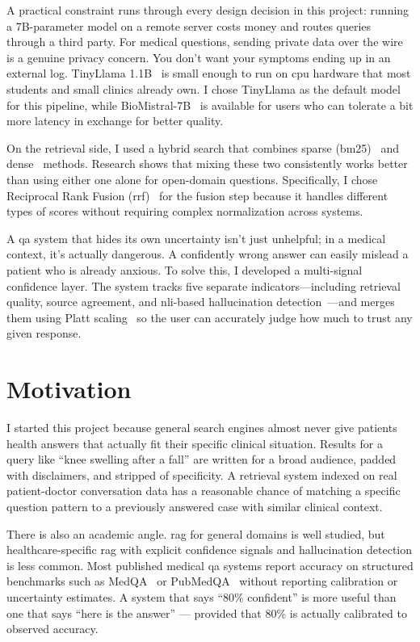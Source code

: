 A practical constraint runs through every design decision in this project: running a 7B-parameter model on a remote server costs money and routes queries through a third party. For medical questions, sending private data over the wire is a genuine privacy concern. You don't want your symptoms ending up in an external log. TinyLlama 1.1B~\cite{zhang2024tinyllama} is small enough to run on \ac{cpu} hardware that most students and small clinics already own. I chose TinyLlama as the default model for this pipeline, while BioMistral-7B~\cite{labrak2024biomistral} is available for users who can tolerate a bit more latency in exchange for better quality.

On the retrieval side, I used a hybrid search that combines sparse (\ac{bm25})~\cite{robertson2009bm25} and dense~\cite{reimers2019sbert} methods. Research shows that mixing these two consistently works better than using either one alone for open-domain questions. Specifically, I chose Reciprocal Rank Fusion (\ac{rrf})~\cite{cormack2009rrf} for the fusion step because it handles different types of scores without requiring complex normalization across systems.

A \ac{qa} system that hides its own uncertainty isn't just unhelpful; in a medical context, it's actually dangerous. A confidently wrong answer can easily mislead a patient who is already anxious. To solve this, I developed a multi-signal confidence layer. The system tracks five separate indicators—including retrieval quality, source agreement, and \ac{nli}-based hallucination detection~\cite{he2021deberta}—and merges them using Platt scaling~\cite{platt1999probabilistic} so the user can accurately judge how much to trust any given response.

\section{Motivation}

I started this project because general search engines almost never give patients health answers that actually fit their specific clinical situation. Results for a query like ``knee swelling after a fall'' are written for a broad audience, padded with disclaimers, and stripped of specificity. A retrieval system indexed on real patient-doctor conversation data has a reasonable chance of matching a specific question pattern to a previously answered case with similar clinical context.

There is also an academic angle. \ac{rag} for general domains is well studied, but healthcare-specific \ac{rag} with explicit confidence signals and hallucination detection is less common. Most published medical \ac{qa} systems report accuracy on structured benchmarks such as MedQA~\cite{jin2021medqa} \allowbreak{}or PubMedQA~\cite{jin2019pubmedqa} without reporting calibration or uncertainty estimates. A system that says ``80\% confident'' is more useful than one that says ``here is the answer'' --- provided that 80\% is actually calibrated to observed accuracy.


